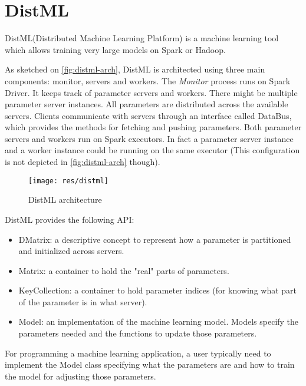 \section*{DistML}
\label{sec:distml}

DistML(Distributed Machine Learning Platform) is a machine learning tool which allows training very large models on Spark or Hadoop.

As sketched on \autoref{fig:distml-arch}, DistML is architected using three main components: monitor, servers and workers. The \textit{Monitor} process runs on Spark Driver. It keeps track of parameter servers and workers. There might be multiple parameter server instances. All parameters are distributed across the available servers. Clients communicate with servers through an interface called DataBus, which provides the methods for fetching and pushing parameters. Both parameter servers and workers run on Spark executors. In fact a parameter server instance and a worker instance could be running on the same executor (This configuration is not depicted in \autoref{fig:distml-arch} though).

\begin{figure}[!h]
  \centering
  \texttt{[image: res/distml]}
  \caption{DistML architecture}
  \label{fig:distml-arch}
\end{figure}

DistML provides the following API: 
\begin{itemize}
  \item DMatrix: a descriptive concept to represent how a parameter is partitioned and initialized across servers.
  \item Matrix: a container to hold the "real" parts of parameters.
  \item KeyCollection: a container to hold parameter indices (for knowing what part of the parameter is in what server).
  \item Model: an implementation of the machine learning model. Models specify the parameters needed and the functions to update those parameters.
\end{itemize} 
For programming a machine learning application, a user typically need to implement the Model class specifying what the parameters are and how to train the model for adjusting those parameters. 

